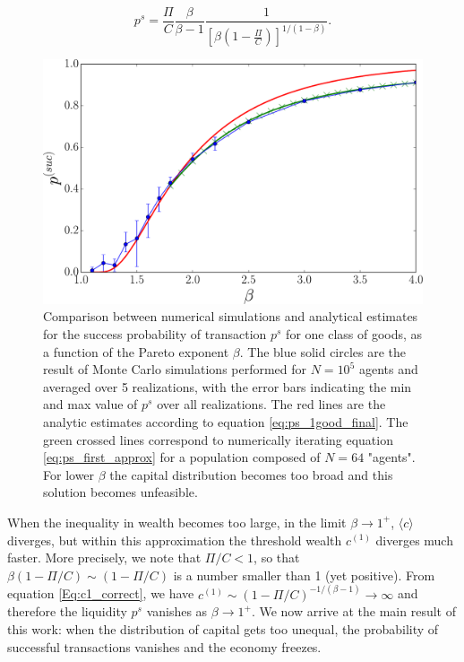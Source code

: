 \begin{equation}
\label{eq:ps_1good_final}
p^s = \frac{\Pi}{C}\frac{\beta}{\beta - 1} \frac{1}{\left[\beta \left(1 - \frac{\Pi}{C}\right) \right]^{1/(1 - \beta)}}.
\end{equation}

\begin{figure}[!ht]
\includegraphics[width=\textwidth]{figs_ineq/fig_K=1_e=1p2_g=undef_ps_prediction_unadj.pdf}
\caption{Comparison between numerical simulations and analytical estimates for the success probability of transaction $p^s$ for one class of goods, as a function of the Pareto exponent $\beta$. The blue solid circles are the result  of Monte Carlo simulations performed for $N=10^5$ agents and averaged over 5 realizations, with the error bars indicating the min and max value of $p^s$ over all realizations. The red lines are the analytic estimates  according to equation \eqref{eq:ps_1good_final}. The green crossed lines correspond to numerically iterating equation  \eqref{eq:ps_first_approx} for a population composed of $N=64$ "agents". For lower $\beta$ the capital distribution becomes too broad and this solution becomes unfeasible.}
\label{Fig:ps_one_good}
\end{figure}

When the inequality in wealth becomes too large, in the limit $\beta \to 1^+$, $\langle c \rangle$ diverges, but within this approximation the threshold wealth $c^{(1)}$ diverges much faster. More precisely, we note that $\Pi/C<1$, so that $\beta ( 1- \Pi/C) \sim (1-\Pi/C)$ is a number smaller than 1 (yet positive). From equation \eqref{Eq:c1_correct}, we have $c^{(1)}\sim (1-\Pi/C)^{-1/(\beta-1)} \to \infty$ and therefore the liquidity $p^s$ vanishes as $\beta \to 1^+$. We now arrive at the main result of this work: when the distribution of capital gets too unequal, the probability of successful transactions vanishes and the economy freezes.

